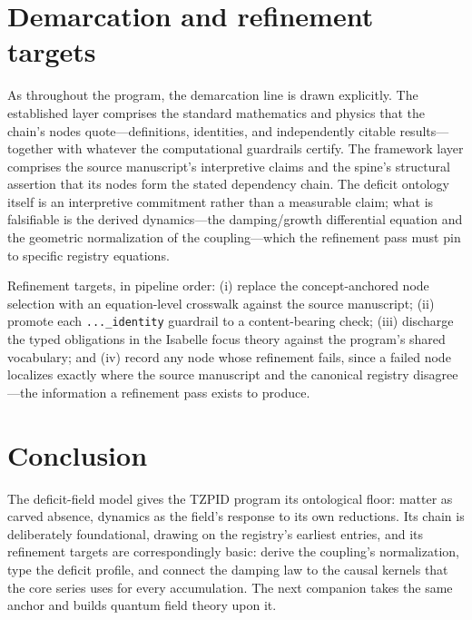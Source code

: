 \documentclass[11pt]{article}
\theoremstyle{remark}
\begin{document}
\section{Demarcation and refinement targets}
\label{sec:demarc}

As throughout the program, the demarcation line is drawn explicitly. The established layer comprises the standard mathematics and physics that the chain's nodes quote---definitions, identities, and independently citable results---together with whatever the computational guardrails certify. The framework layer comprises the source manuscript's interpretive claims and the spine's structural assertion that its nodes form the stated dependency chain. The deficit ontology itself is an interpretive commitment rather than a measurable claim; what is falsifiable is the derived dynamics---the damping/growth differential equation and the geometric normalization of the coupling---which the refinement pass must pin to specific registry equations.

Refinement targets, in pipeline order: (i) replace the concept-anchored node selection with an equation-level crosswalk against the source manuscript; (ii) promote each \texttt{...\_identity} guardrail to a content-bearing check; (iii) discharge the typed obligations in the Isabelle focus theory against the program's shared vocabulary; and (iv) record any node whose refinement fails, since a failed node localizes exactly where the source manuscript and the canonical registry disagree---the information a refinement pass exists to produce.

\section{Conclusion}
\label{sec:conc}

The deficit-field model gives the TZPID program its ontological floor: matter as carved absence, dynamics as the field's response to its own reductions. Its chain is deliberately foundational, drawing on the registry's earliest entries, and its refinement targets are correspondingly basic: derive the coupling's normalization, type the deficit profile, and connect the damping law to the causal kernels that the core series uses for every accumulation. The next companion takes the same anchor and builds quantum field theory upon it.
\end{document}
